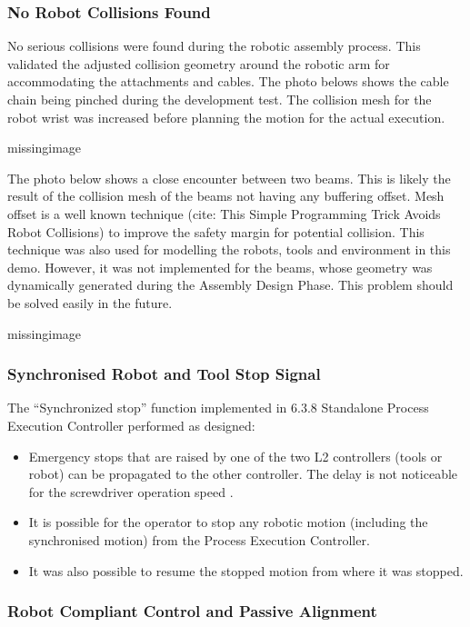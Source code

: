 \subsubsection{No Robot Collisions Found}
\label{subsubsection:exploration_4_no_robot_collisions_found}

No serious collisions were found during the robotic assembly process. This validated the adjusted collision geometry around the robotic arm for accommodating the attachments and cables. The photo belows shows the cable chain being pinched during the development test. The collision mesh for the robot wrist was increased before planning the motion for the actual execution.

missingimage

The photo below shows a close encounter between two beams. This is likely the result of the collision mesh of the beams not having any buffering offset. Mesh offset is a well known technique (cite: This Simple Programming Trick Avoids Robot Collisions) to improve the safety margin for potential collision. This technique was also used for modelling the robots, tools and environment in this demo. However, it was not implemented for the beams, whose geometry was dynamically generated during the Assembly Design Phase. This problem should be solved easily in the future.

missingimage

\subsubsection{Synchronised Robot and Tool Stop Signal}
\label{subsubsection:exploration_4_synchronised_robot_and_tool_stop_signal}

The “Synchronized stop” function implemented in 6.3.8 Standalone Process Execution Controller performed as designed:
\begin{itemize}
    \item Emergency stops that are raised by one of the two L2 controllers (tools or robot) can be propagated to the other controller. The delay is not noticeable for the screwdriver operation speed .
    \item It is possible for the operator to stop any robotic motion (including the synchronised motion) from the Process Execution Controller.
    \item It was also possible to resume the stopped motion from where it was stopped.
\end{itemize}

\subsubsection{Robot Compliant Control and Passive Alignment}
\label{subsubsection:exploration_4_robot_compliant_control_and_passive_alignment}

